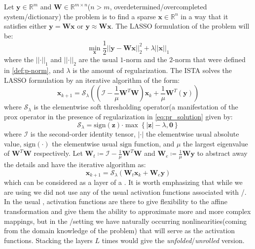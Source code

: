 Let $\boldsymbol{y} \in \mathbb{R}^m$ and $\boldsymbol{W} \in \mathbb{R}^{m \times n}$($n > m$, overdetermined/overcompleted system/dictionary)
the \sdl\index{\sdl} problem is to find a sparse $\boldsymbol{x} \in \mathbb{R}^n$ in a way that it satisfies either $\boldsymbol{y} = \boldsymbol{W}\boldsymbol{x}$ or $\boldsymbol{y} \approx \boldsymbol{W}\boldsymbol{x}$.
The \ac{LASSO}\cite{Hastie2009} formulation of the problem will be:
\begin{equation*}
  \min_{\boldsymbol{x}} \frac{1}{2} \left|\left|\boldsymbol{y}-\boldsymbol{W}\boldsymbol{x}\right|\right|_2^2 + \lambda \left|\left|\boldsymbol{x}\right|\right|_1
\end{equation*}
where the $\left|\left|\boldsymbol{\cdot}\right|\right|_1$ and $\left|\left|\boldsymbol{\cdot}\right|\right|_2$ are the usual $1$-norm and the $2$-norm that were defined in \cref{def:p-norm}, and $\lambda$ is the amount of regularization\cite{Hastie2009}. 
The \ac{ISTA}\cite{Daubechies2003} solves the \ac{LASSO}\cite{Hastie2009} formulation by an iterative algorithm of the form:
\begin{equation*}
  \boldsymbol{x}_{k+1} = \mathcal{S}_\lambda\left(\left(\mathcal{I}-\frac{1}{\mu}\boldsymbol{W}^T\boldsymbol{W}\right)\boldsymbol{x}_k+\frac{1}{\mu}\boldsymbol{W}^T\left(\boldsymbol{y}\right)\right)
\end{equation*}
where $\mathcal{S}_\lambda$ is the elementwise soft thresholding operator(a manifestation of the $\mathrm{prox}$ operator in the presence of regularization in \cref{eq:pr_solution} given by:
\begin{equation*}
  \mathcal{S}_\lambda = \mathrm{sign}(\boldsymbol{z}) \boldsymbol{\cdot} \max \left\{\left|\boldsymbol{z}\right|-\lambda,\boldsymbol{0}\right\}
\end{equation*}
where $\mathcal{I}$ is the second-order identity tensor\cite{Hackbusch2019}, $\left|\boldsymbol{\cdot}\right|$ the elementwise usual absolute value, 
$\mathrm{sign}(\boldsymbol{\cdot})$ the elementwise usual $\mathrm{sign}$ function, and $\mu$ the largest eigenvalue \cite{Hackbusch2019} 
 of $\boldsymbol{W}^T\boldsymbol{W}$ respectively.
Let $\boldsymbol{W}_t \coloneqq \mathcal{I}-\frac{1}{\mu}\boldsymbol{W}^T\boldsymbol{W}$ and 
$\boldsymbol{W}_e \coloneqq \frac{1}{\mu}\boldsymbol{W}\boldsymbol{y}$ to abstract away the details and have the iterative algorithm 
as:
\begin{equation*}
  \boldsymbol{x}_{k+1} = \mathcal{S}_\lambda\left(\boldsymbol{W}_t\boldsymbol{x}_{k}+\boldsymbol{W}_e\boldsymbol{y}\right)
\end{equation*}
which can be considered as a layer of a \nn. It is worth emphasizing that 
while we are using \nns we did not use any of the usual activation functions associated with \ml/\dl.
In the usual \nns, activation functions are there to give flexibility to the affine transformation 
and give them the ability to approximate more and more complex mappings, but in the \du/\au setting we have naturally occurring 
nonlinearities(coming from the domain knowledge of the problem) that will serve as the activation 
functions. Stacking the layers $L$ times would give the \emph{unfolded}/\emph{unrolled} version.

